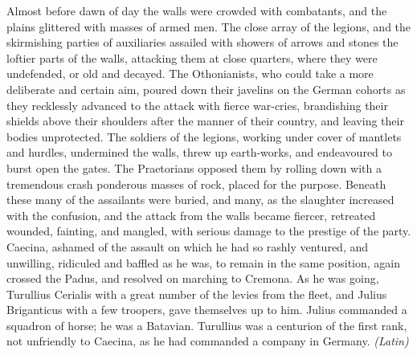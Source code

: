 Almost before dawn of day the walls were crowded with combatants, and the plains glittered with masses of armed men. The close array of the legions, and the skirmishing parties of auxiliaries assailed with showers of arrows and stones the loftier parts of the walls, attacking them at close quarters, where they were undefended, or old and decayed. The Othonianists, who could take a more deliberate and certain aim, poured down their javelins on the German cohorts as they recklessly advanced to the attack with fierce war-cries, brandishing their shields above their shoulders after the manner of their country, and leaving their bodies unprotected. The soldiers of the legions, working under cover of mantlets and hurdles, undermined the walls, threw up earth-works, and endeavoured to burst open the gates. The Praetorians opposed them by rolling down with a tremendous crash ponderous masses of rock, placed for the purpose. Beneath these many of the assailants were buried, and many, as the slaughter increased with the confusion, and the attack from the walls became fiercer, retreated wounded, fainting, and mangled, with serious damage to the prestige of the party. Caecina, ashamed of the assault on which he had so rashly ventured, and unwilling, ridiculed and baffled as he was, to remain in the same position, again crossed the Padus, and resolved on marching to Cremona. As he was going, Turullius Cerialis with a great number of the levies from the fleet, and Julius Briganticus with a few troopers, gave themselves up to him. Julius commanded a squadron of horse; he was a Batavian. Turullius was a centurion of the first rank, not unfriendly to Caecina, as he had commanded a company in Germany. \emph{(Latin)}


